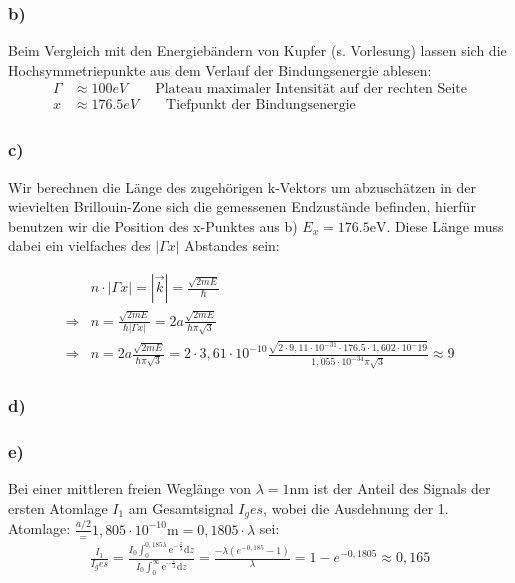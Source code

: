 \subsubsection*{b)}
Beim Vergleich mit den Energiebändern von Kupfer (s. Vorlesung) lassen sich die Hochsymmetriepunkte aus dem Verlauf der Bindungsenergie ablesen:
\begin{align*}
\Gamma &\approx 100 \unit{eV}\qquad\text{Plateau maximaler  Intensität auf der rechten Seite}\\
x &\approx 176.5\unit{eV} \qquad\text{Tiefpunkt der Bindungsenergie}
\end{align*}
\subsubsection*{c)}
Wir berechnen die Länge des zugehörigen k-Vektors um abzuschätzen in der wievielten 
Brillouin-Zone sich die gemessenen Endzustände befinden, hierfür benutzen wir die 
Position des x-Punktes aus b) $E_x = 176.5 \mathrm{eV}$. Diese Länge muss dabei ein
vielfaches des $|\Gamma x|$ Abstandes sein:

 
\begin{align*}
&n\cdot |\Gamma x| = |\vec{k}| = \frac{\sqrt{2mE}}{\hbar}\\
\Rightarrow & n = \frac{\sqrt{2mE}}{\hbar|\Gamma x|} = 2a\frac{\sqrt{2mE}}{\hbar\pi\sqrt{3}}\\
\Rightarrow & n =  2a\frac{\sqrt{2mE}}{\hbar\pi\sqrt{3}} = 2\cdot3,61\cdot10^{-10}\frac{\sqrt{2\cdot9,11\cdot10^{-31}\cdot176.5\cdot1,602\cdot10^-19}}{1,055\cdot10^{-34}\pi\sqrt{3}} \approx 9
\end{align*}
\subsubsection*{d)}

\subsubsection*{e)}
Bei einer mittleren freien Weglänge von $\lambda = 1\mathrm{nm}$ ist der Anteil des Signals der ersten Atomlage $I_1$ am Gesamtsignal $I_ges$, wobei die Ausdehnung der 1. Atomlage: $\frac{a/2} = 1,805\cdot10^{-10} \mathrm{m} = 0,1805\cdot \lambda$ sei:
\begin{align*}
\frac{I_1}{I_ges} = \frac{I_0\int_0^{0,185\lambda}\mathrm{e}^{-\frac{z}{\lambda}}\mathrm{d}z}{I_0\int_0^{\infty}\mathrm{e}^{-\frac{z}{\lambda}}\mathrm{d}z} = \frac{-\lambda(e^{-0,185}-1)}{\lambda} = 1-e^{-0,1805} \approx 0,165
\end{align*}